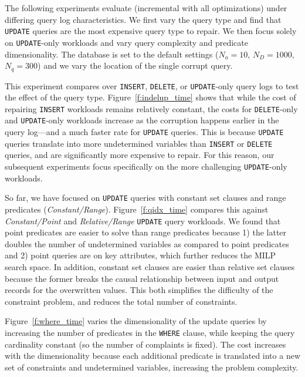 The following experiments evaluate \sys (incremental with all optimizations) under differing query log characteristics.
We first vary the query type and find that \texttt{UPDATE} queries are the most expensive query type to repair.
We then focus solely on \texttt{UPDATE}-only workloads and vary query complexity and predicate dimensionality.
The database is set to the default settings ($N_a=10$, $N_D=1000$, $N_q=300$) and we vary the location of the single corrupt query.

\label{sec:indelup}
This experiment compares \sys over \texttt{INSERT}, \texttt{DELETE}, or \texttt{UPDATE}-only query logs to test the effect of the query type.
Figure~\ref{f:indelup_time} shows that while the cost of repairing \texttt{INSERT} workloads
remains relatively constant, the costs for \texttt{DELETE}-only and \texttt{UPDATE}-only workloads increase as 
the corruption happens earlier in the query log---and a much faster rate for \texttt{UPDATE} queries.
This is because \texttt{UPDATE} queries translate into more undetermined variables than \texttt{INSERT} or \texttt{DELETE} queries, and are significantly more expensive to repair. 
For this reason, our subsequent experiments focus specifically on the more challenging \texttt{UPDATE}-only workloads.

\smallskip
{}
So far, we have focused on \texttt{UPDATE} queries with constant set clauses and range predicates ({\it Constant/Range}).  
Figure~\ref{f:qidx_time} compares this against {\it Constant/Point} and {\it Relative/Range} \texttt{UPDATE} query workloads. 
We found that point predicates are easier to solve than range predicates because 
1) the latter doubles the number of undetermined variables as compared to point predicates and 
2) point queries are on key attributes, which further reduces the MILP search space.
In addition, constant set clauses are easier than relative set clauses because
the former breaks the causal relationship between input and output records for the overwritten values.
This both simplifies the difficulty of the constraint problem, and reduces the total number of constraints.


\smallskip
{}
Figure~\ref{f:where_time} varies the dimensionality of the update queries by increasing the number of predicates in the \texttt{WHERE} clause, while keeping the query cardinality constant (so the number of complaints is fixed).
The cost increases with the dimensionality because each additional predicate is translated into a new set of constraints and undetermined variables, increasing the problem complexity.

